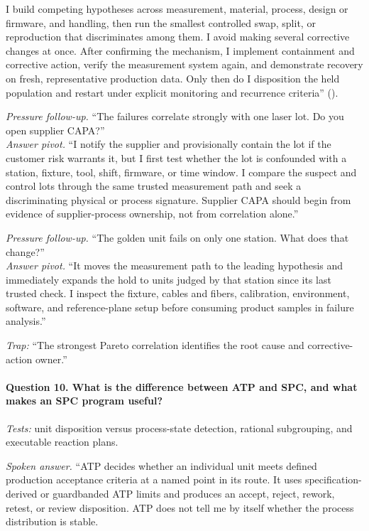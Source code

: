 I build competing hypotheses across measurement, material, process, design or
firmware, and handling, then run the smallest controlled swap, split, or
reproduction that discriminates among them. I avoid making several corrective
changes at once. After confirming the mechanism, I implement containment and
corrective action, verify the measurement system again, and demonstrate
recovery on fresh, representative production data. Only then do I disposition
the held population and restart under explicit monitoring and recurrence
criteria''
().

\textit{Pressure follow-up.} ``The failures correlate strongly with one laser
lot. Do you open supplier CAPA?''\\
\textit{Answer pivot.} ``I notify the supplier and provisionally contain the
lot if the customer risk warrants it, but I first test whether the lot is
confounded with a station, fixture, tool, shift, firmware, or time window. I
compare the suspect and control lots through the same trusted measurement path
and seek a discriminating physical or process signature. Supplier CAPA should
begin from evidence of supplier-process ownership, not from correlation alone.''

\textit{Pressure follow-up.} ``The golden unit fails on only one station. What
does that change?''\\
\textit{Answer pivot.} ``It moves the measurement path to the leading
hypothesis and immediately expands the hold to units judged by that station
since its last trusted check. I inspect the fixture, cables and fibers,
calibration, environment, software, and reference-plane setup before consuming
product samples in failure analysis.''

\textit{Trap:} ``The strongest Pareto correlation identifies the root cause and
corrective-action owner.''

\paragraph{Question 10. What is the difference between ATP and SPC, and what
makes an SPC program useful?}
\textit{Tests:} unit disposition versus process-state detection, rational
subgrouping, and executable reaction plans.

\textit{Spoken answer.}
``ATP decides whether an individual unit meets defined production acceptance
criteria at a named point in its route. It uses specification-derived or
guardbanded ATP limits and produces an accept, reject, rework, retest, or review
disposition. ATP does not tell me by itself whether the process distribution is
stable.

